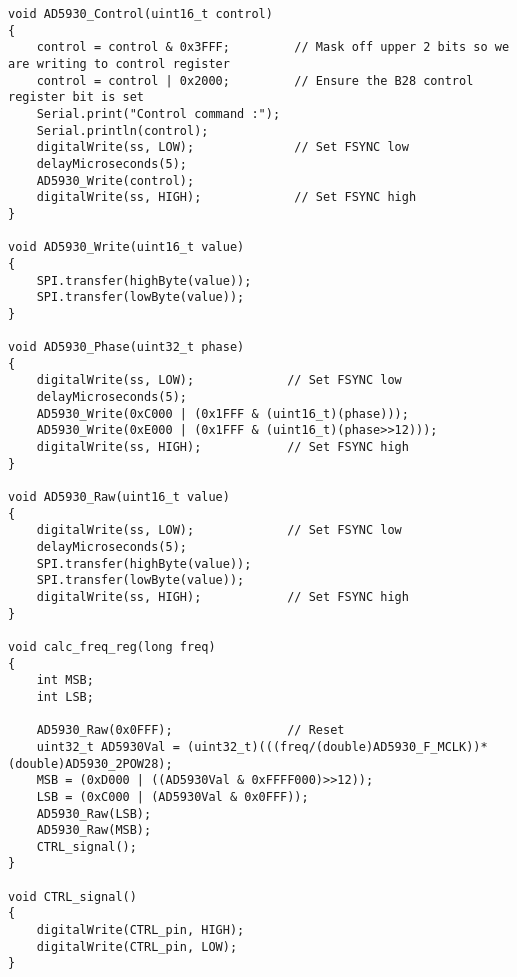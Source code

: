\begin{lstlisting}
void AD5930_Control(uint16_t control)
{
	control = control & 0x3FFF;         // Mask off upper 2 bits so we are writing to control register
	control = control | 0x2000;         // Ensure the B28 control register bit is set
	Serial.print("Control command :");
	Serial.println(control);
	digitalWrite(ss, LOW);              // Set FSYNC low
	delayMicroseconds(5);
	AD5930_Write(control);
	digitalWrite(ss, HIGH);             // Set FSYNC high
}

void AD5930_Write(uint16_t value)
{
	SPI.transfer(highByte(value));
	SPI.transfer(lowByte(value));
}

void AD5930_Phase(uint32_t phase)
{
	digitalWrite(ss, LOW);             // Set FSYNC low
	delayMicroseconds(5);
	AD5930_Write(0xC000 | (0x1FFF & (uint16_t)(phase)));
	AD5930_Write(0xE000 | (0x1FFF & (uint16_t)(phase>>12)));
	digitalWrite(ss, HIGH);            // Set FSYNC high
}

void AD5930_Raw(uint16_t value)
{
	digitalWrite(ss, LOW);             // Set FSYNC low
	delayMicroseconds(5);
	SPI.transfer(highByte(value));
	SPI.transfer(lowByte(value));
	digitalWrite(ss, HIGH);            // Set FSYNC high
}

void calc_freq_reg(long freq)
{
	int MSB;
	int LSB;
	
	AD5930_Raw(0x0FFF);                // Reset
	uint32_t AD5930Val = (uint32_t)(((freq/(double)AD5930_F_MCLK))*(double)AD5930_2POW28);
	MSB = (0xD000 | ((AD5930Val & 0xFFFF000)>>12));
	LSB = (0xC000 | (AD5930Val & 0x0FFF));
	AD5930_Raw(LSB);
	AD5930_Raw(MSB);	
	CTRL_signal();
}

void CTRL_signal()
{
	digitalWrite(CTRL_pin, HIGH);
	digitalWrite(CTRL_pin, LOW);
}

\end{lstlisting}


